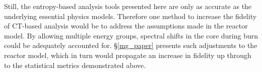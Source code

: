 Still, the entropy-based analysis tools presented here are only as accurate as the 
underlying essential physics models.  Therefore one method to increase the fidelity of
CT-based analysis would be to address the assumptions made in the reactor model.  By allowing
multiple energy groups, spectral shifts in the core during burn could be adequately accounted for.  
\S \ref{mg_paper} presents such adjustments to the reactor model, which in turn would propagate 
an increase in fidelity up through to the statistical metrics demonstrated above.
 
